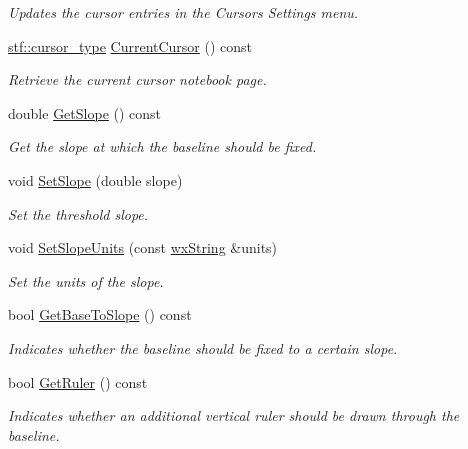 \begin{DoxyCompactItemize}
\begin{DoxyCompactList}\small\item\em Updates the cursor entries in the Cursors Settings menu. \item\end{DoxyCompactList}\item 
\hyperlink{group__stfgen_gad2d1acb3ac0c16ee32b5f4d3a1ab4abf}{stf::cursor\_\-type} \hyperlink{classwxStfCursorsDlg_a2fe14dd421b1df3d14c7fba062bb56a8}{CurrentCursor} () const 
\begin{DoxyCompactList}\small\item\em Retrieve the current cursor notebook page. \item\end{DoxyCompactList}\item 
double \hyperlink{classwxStfCursorsDlg_a24a5953757bb1883724c18088a65b380}{GetSlope} () const 
\begin{DoxyCompactList}\small\item\em Get the slope at which the baseline should be fixed. \item\end{DoxyCompactList}\item 
void \hyperlink{classwxStfCursorsDlg_ad761357b9b82e1e9ffa3bd70a7dca671}{SetSlope} (double slope)
\begin{DoxyCompactList}\small\item\em Set the threshold slope. \item\end{DoxyCompactList}\item 
void \hyperlink{classwxStfCursorsDlg_ad6d4fd19849612abd62db33ede3d3ca6}{SetSlopeUnits} (const \hyperlink{classwxString}{wxString} \&units)
\begin{DoxyCompactList}\small\item\em Set the units of the slope. \item\end{DoxyCompactList}\item 
bool \hyperlink{classwxStfCursorsDlg_a52bed6f2df9a325990130f1958de9d37}{GetBaseToSlope} () const 
\begin{DoxyCompactList}\small\item\em Indicates whether the baseline should be fixed to a certain slope. \item\end{DoxyCompactList}\item 
bool \hyperlink{classwxStfCursorsDlg_a000170c56fe7f09dc830f89031fc6e4c}{GetRuler} () const 
\begin{DoxyCompactList}\small\item\em Indicates whether an additional vertical ruler should be drawn through the baseline. \item\end{DoxyCompactList}\item 

\end{DoxyCompactItemize}
